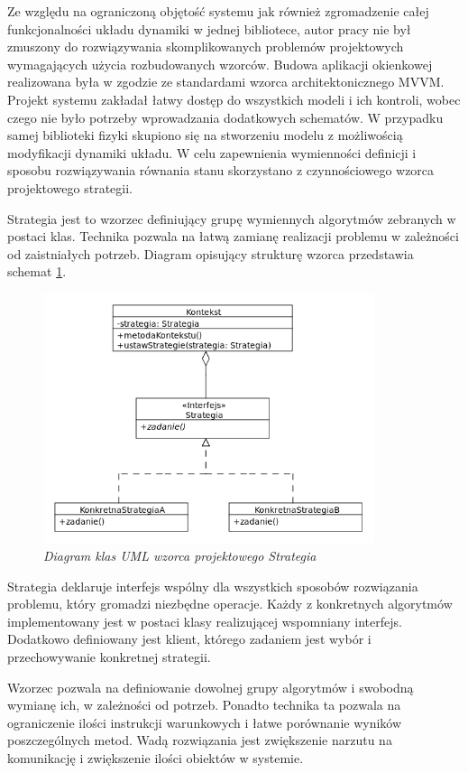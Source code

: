 \documentclass[12pt, oneside]{report}
\theoremstyle{definition}
\begin{document}
Ze względu na ograniczoną objętość systemu jak również zgromadzenie całej funkcjonalności układu dynamiki w jednej bibliotece, autor pracy nie był zmuszony do rozwiązywania skomplikowanych problemów projektowych wymagających użycia rozbudowanych wzorców. Budowa aplikacji okienkowej realizowana była w zgodzie ze standardami wzorca architektonicznego MVVM. Projekt systemu zakładał łatwy dostęp do wszystkich modeli i ich kontroli, wobec czego nie było potrzeby wprowadzania dodatkowych schematów. W przypadku samej biblioteki fizyki skupiono się na stworzeniu modelu z możliwością modyfikacji dynamiki układu. W celu zapewnienia wymienności definicji i sposobu rozwiązywania równania stanu skorzystano z czynnościowego wzorca projektowego strategii.

Strategia jest to wzorzec definiujący grupę wymiennych algorytmów zebranych w postaci klas. Technika pozwala na łatwą zamianę realizacji problemu w zależności od zaistniałych potrzeb. Diagram opisujący strukturę wzorca przedstawia schemat \ref{StrategyPattern}.

\begin{figure}[H]
	\centering
		\includegraphics[width = 275pt]{StrategyPattern} 
		\caption{\textit{Diagram klas UML wzorca projektowego Strategia}}
		\label{StrategyPattern}
\end{figure}

Strategia deklaruje interfejs wspólny dla wszystkich sposobów rozwiązania problemu, który gromadzi niezbędne operacje. Każdy z konkretnych algorytmów implementowany jest w postaci klasy realizującej wspomniany interfejs. Dodatkowo definiowany jest klient, którego zadaniem jest wybór i przechowywanie konkretnej strategii. 

Wzorzec pozwala na definiowanie dowolnej grupy algorytmów i swobodną wymianę ich, w zależności od potrzeb. Ponadto technika ta pozwala na ograniczenie ilości instrukcji warunkowych i łatwe porównanie wyników poszczególnych metod. Wadą rozwiązania jest zwiększenie narzutu na komunikację i zwiększenie ilości obiektów w systemie.
\end{document}
